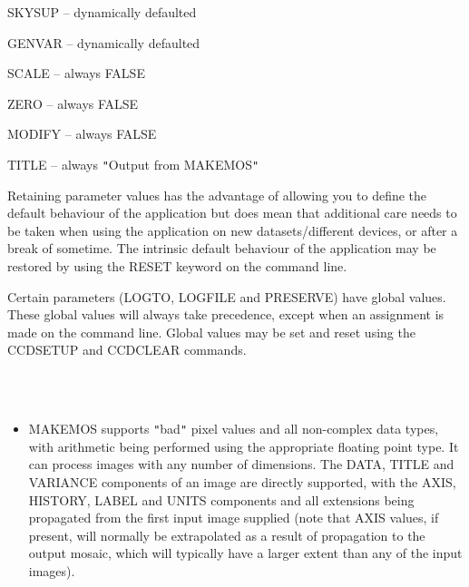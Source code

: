 \documentclass[twoside,11pt]{article}
\newcommand{\htmlref}[2]{#1}
\renewcommand{\_}{\texttt{\symbol{95}}}
\newcommand{\qt}[1]{{\tt "}#1{\tt "}}
\newcommand{\routine}[1]{{\sc #1}}
\newcommand{\xroutine}[1]{\htmlref{{\sc #1}}{#1}}
\newcommand{\sstimplementationstatus}[1]{
   \item[{Implementation Status:}] \mbox{} \\[1.3ex] #1}
\newcommand{\sstitemlist}[1]{
  \mbox{} \\
  \vspace{-3.5ex}
  \begin{itemize}
     #1
  \end{itemize}
}
\newcommand{\sstitem}{\item}
\newcommand{\sstimplementationstatus}[1]{
      \item[Implementation Status:] #1
   }
\newcommand{\sstitemlist}[1]{
      \begin{itemize}
         #1
      \end{itemize}
      \\
   }
\newcommand{\sstitem}{\item}
\begin{document}
{{{         \sstitem
            SKYSUP  -- dynamically defaulted
         \sstitem 
            GENVAR  -- dynamically defaulted
         \sstitem
            SCALE   -- always FALSE
         \sstitem
            ZERO    -- always FALSE
         \sstitem
            MODIFY  -- always FALSE
         \sstitem
            TITLE   -- always \qt{Output from MAKEMOS}

      }
      Retaining parameter values has the advantage of allowing you to
      define the default behaviour of the application but does mean
      that additional care needs to be taken when using the application
      on new datasets/different devices, or after a break of sometime.
      The intrinsic default behaviour of the application may be
      restored by using the RESET keyword on the command line.

      Certain parameters (LOGTO, LOGFILE and PRESERVE) have global
      values. These global values will always take precedence, except
      when an assignment is made on the command line. Global values may
      be set and reset using the \xroutine{CCDSETUP} and \xroutine{CCDCLEAR} commands.
   }
   \sstimplementationstatus{
      \sstitemlist{

         \sstitem
         \routine{MAKEMOS} supports \qt{bad} pixel values and all non-complex data
           types, with arithmetic being performed using the appropriate
           floating point type. It can process images with any number of
           dimensions. The DATA, TITLE and VARIANCE components of an image
           are directly supported, with the AXIS, HISTORY, LABEL 
           and UNITS components and all extensions being propagated from
           the first input image supplied (note that AXIS values, if
           present, will normally be extrapolated as a result of
           propagation to the output mosaic, which will typically have a
           larger extent than any of the input images).
      }
   }
}
\end{document}
